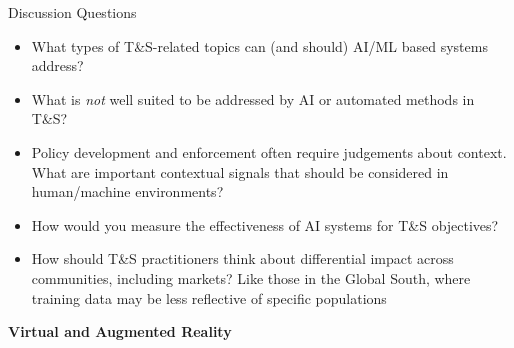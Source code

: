 \documentclass[nobackground,dvipsnames,table]{beamer}
\begin{document}
\begin{frame}{Discussion Questions}

\begin{itemize}
    \item What types of T\&S-related topics can (and should) AI/ML based systems address?
    \item What is \emph{not} well suited to be addressed by AI or automated methods in T\&S?
    \item Policy development and enforcement often require judgements about context. What are important contextual signals that should be considered in human/machine environments?
    \item How would you measure the effectiveness of AI systems for T\&S objectives?
    \item How should T\&S practitioners think about differential impact across communities, including markets? Like those in the Global South, where training data may be less reflective of specific populations
\end{itemize}

\end{frame}



\begin{frame}{}

\Huge{\textbf{Virtual and Augmented Reality}}

\end{frame}
\end{document}
